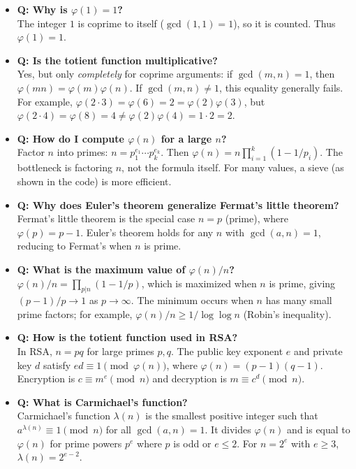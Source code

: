 \begin{itemize}
\item \textbf{Q: Why is $\varphi(1) = 1$?} \\
The integer $1$ is coprime to itself ($\gcd(1,1) = 1$), so it is counted. Thus $\varphi(1) = 1$.

\item \textbf{Q: Is the totient function multiplicative?} \\
Yes, but only \emph{completely} for coprime arguments: if $\gcd(m,n) = 1$, then $\varphi(mn) = \varphi(m)\varphi(n)$. If $\gcd(m,n) \neq 1$, this equality generally fails. For example, $\varphi(2 \cdot 3) = \varphi(6) = 2 = \varphi(2)\varphi(3)$, but $\varphi(2 \cdot 4) = \varphi(8) = 4 \neq \varphi(2)\varphi(4) = 1 \cdot 2 = 2$.

\item \textbf{Q: How do I compute $\varphi(n)$ for a large $n$?} \\
Factor $n$ into primes: $n = p_1^{e_1} \cdots p_k^{e_k}$. Then $\varphi(n) = n \prod_{i=1}^k (1 - 1/p_i)$. The bottleneck is factoring $n$, not the formula itself. For many values, a sieve (as shown in the code) is more efficient.

\item \textbf{Q: Why does Euler's theorem generalize Fermat's little theorem?} \\
Fermat's little theorem is the special case $n = p$ (prime), where $\varphi(p) = p-1$. Euler's theorem holds for any $n$ with $\gcd(a,n) = 1$, reducing to Fermat's when $n$ is prime.

\item \textbf{Q: What is the maximum value of $\varphi(n)/n$?} \\
$\varphi(n)/n = \prod_{p|n}(1 - 1/p)$, which is maximized when $n$ is prime, giving $(p-1)/p \to 1$ as $p \to \infty$. The minimum occurs when $n$ has many small prime factors; for example, $\varphi(n)/n \geq 1/\log\log n$ (Robin's inequality).

\item \textbf{Q: How is the totient function used in RSA?} \\
In RSA, $n = pq$ for large primes $p, q$. The public key exponent $e$ and private key $d$ satisfy $ed \equiv 1 \pmod{\varphi(n)}$, where $\varphi(n) = (p-1)(q-1)$. Encryption is $c \equiv m^e \pmod{n}$ and decryption is $m \equiv c^d \pmod{n}$.

\item \textbf{Q: What is Carmichael's function?} \\
Carmichael's function $\lambda(n)$ is the smallest positive integer such that $a^{\lambda(n)} \equiv 1 \pmod{n}$ for all $\gcd(a,n) = 1$. It divides $\varphi(n)$ and is equal to $\varphi(n)$ for prime powers $p^e$ where $p$ is odd or $e \leq 2$. For $n = 2^e$ with $e \geq 3$, $\lambda(n) = 2^{e-2}$.


\end{itemize}
